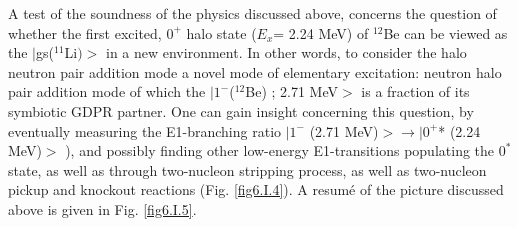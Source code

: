 \begin{subappendices}
A  test of the soundness of the physics  discussed above, concerns the question of whether the first excited, 
$0^+$ halo state ($E_x$= 2.24 MeV) of $^{12}$Be can be viewed as the $|$gs($^{11}$Li$)>$ in a new environment. In other words, 
to consider the halo neutron pair addition mode
 a novel mode of  elementary excitation: neutron halo pair  addition mode of which the $|1^- $($^{12}$Be) ; 2.71 MeV$> $ is 
 a fraction of  its symbiotic  GDPR partner. One can gain insight concerning this question, by 
 eventually measuring the E1-branching ratio $|1^-$ (2.71 MeV)$>  \to |0^+$* (2.24 MeV)$>$ ), and possibly 
 finding other low-energy E1-transitions populating the $0^*$ state, as well as through  two-nucleon stripping process,
 as well as two-nucleon pickup and knockout reactions (Fig. \ref{fig6.I.4}).
 A resum\'e of the picture discussed above is given   in Fig. \ref{fig6.I.5}.










\end{subappendices}

%
 